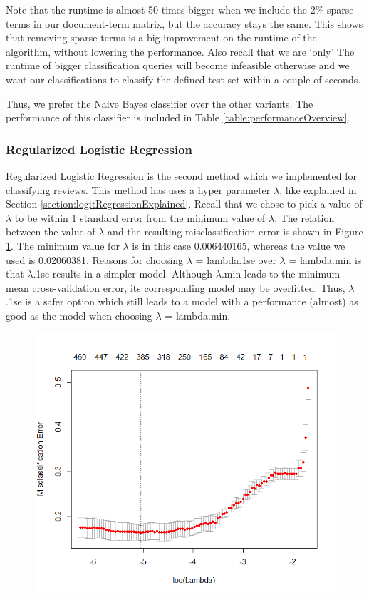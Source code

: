 \documentclass[a4paper,11pt]{article}
\begin{document}
Note that the runtime is almost 50 times bigger when we include the 2\% sparse terms in our document-term matrix, but the accuracy stays the same. This shows that removing sparse terms is a big improvement on the runtime of the algorithm, without lowering the performance. Also recall that we are `only' The runtime of bigger classification queries will become infeasible otherwise and we want our classifications to classify the defined test set within a couple of seconds. 

Thus, we prefer the Naive Bayes classifier over the other variants. The performance of this classifier is included in Table \ref{table:performanceOverview}.

\subsubsection{Regularized Logistic Regression}
Regularized Logistic Regression is the second method which we implemented for classifying reviews. This method has uses a hyper parameter $\lambda$, like explained in Section \ref{section:logitRegressionExplained}. Recall that we chose to pick a value of $\lambda$ to be within 1 standard error from the minimum value of $\lambda$. The relation between the value of $\lambda$ and the resulting misclassification error is shown in Figure \ref{figure:lambda}. The minimum value for $\lambda$ is in this case 0.006440165, whereas the value we used is 0.02060381. Reasons for choosing $\lambda$ = lambda.1se over $\lambda$ = lambda.min is that $\lambda$.1se results in a simpler model. Although $\lambda$.min leads to the minimum mean cross-validation error, its corresponding model may be overfitted. Thus, $\lambda$.1se is a safer option which still leads to a model with a performance (almost) as good as the model when choosing $\lambda$ = lambda.min. 

\begin{figure}[H]
\label{figure:lambda}
\centering
\includegraphics[width=0.8\linewidth]{lambda.png}
\end{figure}
\end{document}
